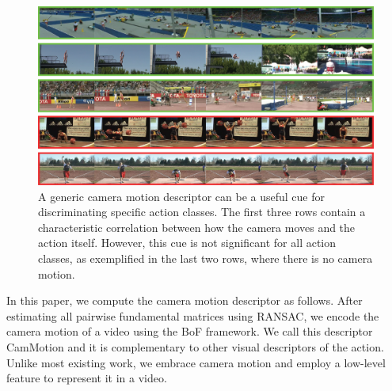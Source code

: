 \documentclass[runningheads]{llncs}
\begin{document}
\begin{figure}[!ht]
\begin{center}
\includegraphics[width=0.98\linewidth]{cam_motion.png}
\end{center}
\vspace{-12pt}\caption{A generic camera motion descriptor can be a useful cue for discriminating specific action classes. The first three rows contain a characteristic correlation between how the camera moves and the action itself. However, this cue is not significant for all action classes, as exemplified in the last two rows, where there is no camera motion.}
\label{fig:camMotion_example}\vspace{-6pt}
\end{figure}

In this paper, we compute the camera motion descriptor as follows. After estimating all pairwise fundamental matrices using RANSAC, we encode the camera motion of a video using the BoF framework. We call this descriptor CamMotion and it is complementary to other visual descriptors of the action. Unlike most existing work, we embrace camera motion and employ a low-level feature to represent it in a video.
\end{document}
